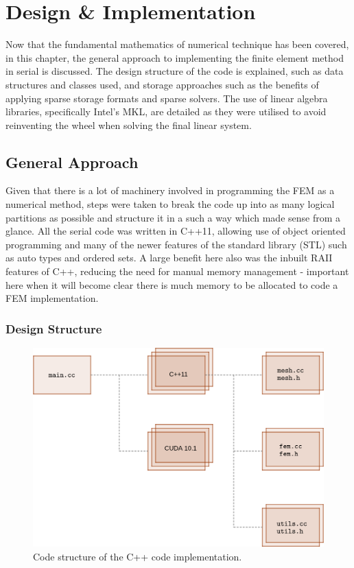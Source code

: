 \clearpage
\chapter{Design \& Implementation}

Now that the fundamental mathematics of numerical technique has been covered, in this chapter, the general approach to implementing the finite element method in serial is discussed. The design structure of the code is explained, such as data structures and classes used, and storage approaches such as the benefits of applying sparse storage formats and sparse solvers. The use of linear algebra libraries, specifically Intel's MKL, are detailed as they were utilised to avoid reinventing the wheel when solving the final linear system. 

\section{General Approach}

Given that there is a lot of machinery involved in programming the FEM as a numerical method, steps were taken to break the code up into as many logical partitions as possible and structure it in a such a way which made sense from a glance. All the serial code was written in C++11, allowing use of object oriented programming and many of the newer features of the standard library (STL) such as auto types and ordered sets. A large benefit here also was the inbuilt RAII features of C++, reducing the need for manual memory management - important here when it will become clear there is much memory to be allocated to code a FEM implementation.

\subsection{Design Structure}
\begin{figure}
	\centering
	\includegraphics[width = 0.7\linewidth]{Figures/cpp_code}
	\caption{Code structure of the C++ code implementation.}
	\label{fig:cpp}
\end{figure}

